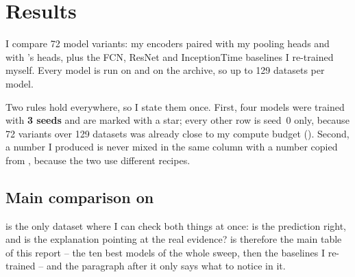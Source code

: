 %

\section{Results}
\label{sec:results}

I compare 72 model variants: my \seanet{} encoders paired with my pooling heads and with
\millet{}'s heads, plus the FCN, ResNet and InceptionTime baselines I re-trained myself. Every model
is run on \webtraffic{} and on the \ucr{} archive, so up to 129 datasets per model.

Two rules hold everywhere, so I state them once. First, four models were trained with \textbf{3
seeds} and are marked with a star; every other row is seed~0 only, because 72 variants over 129
datasets was already close to my compute budget (). Second, a number I
produced is never mixed in the same column with a number copied from \citet{early2024millet},
because the two use different recipes.

\subsection{Main comparison on \webtraffic{}}
\label{sec:res:web}

\webtraffic{} is the only dataset where I can check both things at once: is the prediction right,
and is the explanation pointing at the real evidence?  is therefore the main
table of this report -- the ten best models of the whole sweep, then the baselines I re-trained --
and the paragraph after it only says what to notice in it.

